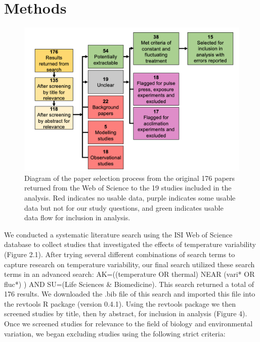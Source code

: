 \documentclass[12pt,twoside]{reedthesis}
\begin{document}
\hypertarget{methods}{%
\chapter{Methods}\label{methods}}
\begin{figure}

{\centering \includegraphics[width=0.9\linewidth]{figures/figure5} 

}

\caption[Meta analysis paper selection process]{Diagram of the paper selection process from the original 176 papers returned from the Web of Science to the 19 studies included in the analysis. Red indicates no usable data, purple indicates some usable data but not for our study questions, and green indicates usable data flow for inclusion in analysis.}\label{fig:unnamed-chunk-7}
\end{figure}
We conducted a systematic literature search using the ISI Web of Science database to collect studies that investigated the effects of temperature variability (Figure 2.1). After trying several different combinations of search terms to capture research on temperature variability, our final search utilized these search terms in an advanced search: AK=((temperature OR thermal) NEAR (vari* OR fluc*) ) AND SU=(Life Sciences \& Biomedicine). This search returned a total of 176 results. We downloaded the .bib file of this search and imported this file into the revtools R package (version 0.4.1). Using the revtools package we then screened studies by title, then by abstract, for inclusion in analysis (Figure 4). Once we screened studies for relevance to the field of biology and environmental variation, we began excluding studies using the following strict criteria:
\end{document}
